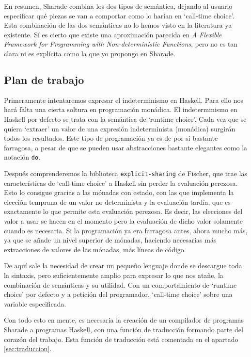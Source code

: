 \documentclass[class=article, crop=false]{standalone}
\begin{document}
En resumen, Sharade combina los dos tipos de semántica, dejando al usuario especificar qué
piezas se van a comportar como lo harían en `call-time choice'. Esta combinación de las dos
semánticas no lo hemos visto en la literatura ya existente. Sí es cierto que existe una
aproximación parecida en \textit{A Flexible Framework for Programming with Non-deterministic
Functions}\cite{lopez2009flexible}, pero no es tan clara ni es explícita como
la que yo propongo en Sharade.

\subsection{Plan de trabajo}
Primeramente intentaremos expresar el indeterminismo en Haskell. Para ello nos hará falta una
cierta soltura en programación monádica. El indeterminismo en Haskell por defecto se trata
con la semántica de `runtime choice'. Cada vez que se quiera `extraer' un valor de una
expresión indeterminista (monádica) surgirán todos los resultados. Este tipo de programación
ya es de por sí bastante farragosa, a pesar de que se pueden usar abstracciones bastante
elegantes como la notación \verb`do`.

Después comprenderemos la biblioteca \verb`explicit-sharing` de Fischer, que trae las
características de `call-time choice' a Haskell sin perder la evaluación perezosa. Esto lo
consigue gracias a las mónadas con estado, con las que implementa la elección temprana de un
valor no determinista y la evaluación tardía, que es exactamente lo que permite esta
evaluación perezosa. Es decir, las elecciones del valor a usar se hacen en el momento pero
la evaluación de dicho valor solamente cuando es necesaria. Si la programación ya era
farragosa antes, ahora mucho más, ya que se añade un nivel superior de mónadas, haciendo
necesarias más extracciones de valores de las mónadas, más líneas de código.

De aquí sale la necesidad de crear un pequeño lenguaje donde se descargue toda la sintaxis,
pero suficientemente amplio para expresar lo que nos atañe, la combinación de semánticas y su
utilidad. Con un comportamiento de `runtime choice' por defecto y a petición del programador,
`call-time choice' sobre una variable especificada.

Con todo esto en mente, es necesaria la creación de un compilador de programas Sharade a
programas Haskell, con una función de traducción formando parte del corazón del trabajo. Esta
función de traducción está comentada en el apartado \ref{sec:traduccion}.
\end{document}
